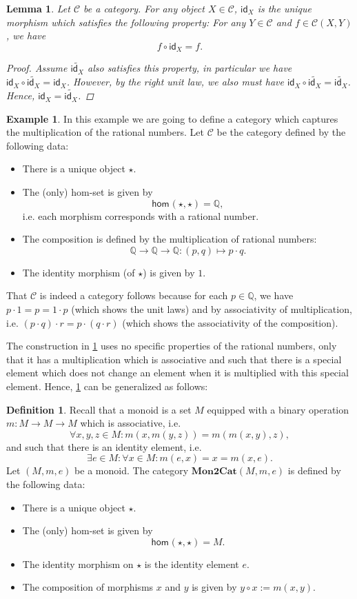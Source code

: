 \documentclass[a4paper,11pt, oneside,titlepage=false]{scrbook}
\theoremstyle{plain}
\newtheorem{lemma}[thm]{Lemma}
\theoremstyle{definition}
\newtheorem{dfn}[thm]{Definition}
\newtheorem{exa}[thm]{Example}
\newcommand{\cfont}[1]{\ensuremath{\mathsf{#1}}}
\newcommand{\Cat}[1]{\mathcal{#1}}
\newcommand{\CC}{\Cat{C}}
\newcommand{\Catb}[1]{\mathbf{#1}}
\newcommand{\MONtoCAT}{\Catb{Mon2Cat}}
\newcommand{\Hom}[3][]{\cfont{hom}_{#1}(#2,#3)}
\newcommand{\CHom}[3]{{#1}(#2,#3)}
\newcommand{\Id}[1][]{\cfont{id}_{#1}}
\newcommand{\co}[2]{\ensuremath{#2 \circ #1}}
\begin{document}
\begin{lemma}\label{lemma:uniqueid} Let $\CC$ be a category. For any object $X\in\CC$, $\Id[X]$ is the unique morphism which satisfies the following property: For any $Y\in\CC$ and $f\in\CHom \CC X Y$, we have
\[
\co{\Id[X]} f = f.
\]
\begin{proof}
Assume $\tilde{\Id[X]}$ also satisfies this property, in particular we have $\co {\tilde{\Id[X]}} {\Id[X]} = \Id[X]$. However, by the right unit law, we also must have $\co{\tilde{\Id[X]}}{\Id[X]} = \tilde{\Id[X]}$. Hence, $\Id[X] = \tilde{\Id[X]}$.
\end{proof}
\end{lemma}

\begin{exa}\label{exa:monoidofrationalnumbers} In this example we are going to define a category which captures the multiplication of the rational numbers. Let $\CC$ be the category defined by the following data:
\begin{itemize}
\item There is a unique object $\star$.
\item The (only) hom-set is given by
\[
\Hom{\star}{\star} = \mathbb{Q},
\]
i.e. each morphism corresponds with a rational number.
\item The composition is defined by the multiplication of rational numbers:
\[
\mathbb{Q} \to\mathbb{Q}\to\mathbb{Q} : (p,q)\mapsto p\cdot q.
\]
\item The identity morphism (of $\star$) is given by $1$.
\end{itemize}
That $\CC$ is indeed a category follows because for each $p\in\mathbb{Q}$, we have $p\cdot 1 = p = 1\cdot p$ (which shows the unit laws) and by associativity of multiplication, i.e. $(p\cdot q)\cdot r = p\cdot (q \cdot r)$ (which shows the associativity of the composition).
\end{exa}
The construction in \cref{exa:monoidofrationalnumbers} uses no specific properties of the rational numbers, only that it has a multiplication which is associative and such that there is a special element which does not change an element when it is multiplied with this special element. Hence, \cref{exa:monoidofrationalnumbers} can be generalized as follows:
\begin{dfn}\label{monoidcategory}
Recall that a monoid is a set $M$ equipped with a binary operation $m : M \to M \to M$ which is associative, i.e.
\[
\forall x,y,z\in M: m(x,m(y,z)) = m(m(x,y),z),
\]
and such that there is an identity element, i.e.
\[
\exists e\in M: \forall x\in M: m(e,x)=x=m(x,e).
\]
Let $(M,m,e)$ be a monoid. The category $\MONtoCAT(M,m,e)$ is defined by the following data:
\begin{itemize}
\item There is a unique object $\star$.
\item The (only) hom-set is given by
\[
\Hom{\star}{\star} = M.
\]
\item The identity morphism on $\star$ is the identity element $e$.
\item The composition of morphisms $x$ and $y$ is given by $\co{x}{y} := m(x,y)$.
\end{itemize}
\end{dfn}
\end{document}
